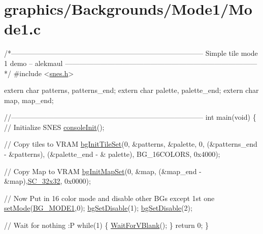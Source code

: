 \hypertarget{a00455}{}\section{graphics/\+Backgrounds/\+Mode1/\+Mode1.\+c}

\begin{DoxyCodeInclude}
\textcolor{comment}{/*---------------------------------------------------------------------------------}
\textcolor{comment}{}
\textcolor{comment}{}
\textcolor{comment}{    Simple tile mode 1 demo}
\textcolor{comment}{    -- alekmaul}
\textcolor{comment}{}
\textcolor{comment}{}
\textcolor{comment}{---------------------------------------------------------------------------------*/}
\textcolor{preprocessor}{#include <\hyperlink{a00419}{snes.h}>}

\textcolor{keyword}{extern} \textcolor{keywordtype}{char} patterns, patterns\_end;
\textcolor{keyword}{extern} \textcolor{keywordtype}{char} palette, palette\_end;
\textcolor{keyword}{extern} \textcolor{keywordtype}{char} map, map\_end;

\textcolor{comment}{//---------------------------------------------------------------------------------}
\textcolor{keywordtype}{int} main(\textcolor{keywordtype}{void}) \{
    \textcolor{comment}{// Initialize SNES }
    \hyperlink{a00383_a6047713bb5a73afd3cd1d77e336bcdad}{consoleInit}();
     
    \textcolor{comment}{// Copy tiles to VRAM}
    \hyperlink{a00380_ae09a7ac09be78eef0f28a6c7aabc82ad}{bgInitTileSet}(0, &patterns, &palette, 0, (&patterns\_end - &patterns), (&palette\_end - &
      palette), BG\_16COLORS, 0x4000);

    \textcolor{comment}{// Copy Map to VRAM}
    \hyperlink{a00380_acc385296e159449a81d18f5e219c8032}{bgInitMapSet}(0, &map, (&map\_end - &map),\hyperlink{a00380_a11724b6748ce0954e9b43819263537fc}{SC\_32x32}, 0x0000);

    \textcolor{comment}{// Now Put in 16 color mode and disable other BGs except 1st one}
    \hyperlink{a00416_afd9e46ae627d055dd8c98a4b0ebb73b1}{setMode}(\hyperlink{a00380_a05c862edb7f8f75036f10c04dcc3c2a6}{BG\_MODE1},0);  \hyperlink{a00380_a4dbfb1b8854ff9ca4a7d11a899281bbb}{bgSetDisable}(1); 
      \hyperlink{a00380_a4dbfb1b8854ff9ca4a7d11a899281bbb}{bgSetDisable}(2);
    
    \textcolor{comment}{// Wait for nothing :P}
    \textcolor{keywordflow}{while}(1) \{
        \hyperlink{a00389_a815e2626bd26d0e936d507a363ecd723}{WaitForVBlank}();
    \}
    \textcolor{keywordflow}{return} 0;
\}
\end{DoxyCodeInclude}
 